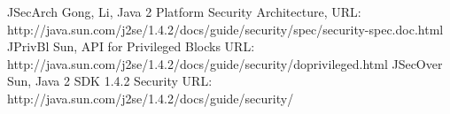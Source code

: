 JSecArch
 Gong, Li, Java 2 Platform Security Architecture, 
 URL: http://java.sun.com/j2se/1.4.2/docs/guide/security/spec/security-spec.doc.html
JPrivBl
 Sun, API for Privileged Blocks
 URL: http://java.sun.com/j2se/1.4.2/docs/guide/security/doprivileged.html
JSecOver
 Sun, Java 2 SDK 1.4.2 Security
 URL: http://java.sun.com/j2se/1.4.2/docs/guide/security/